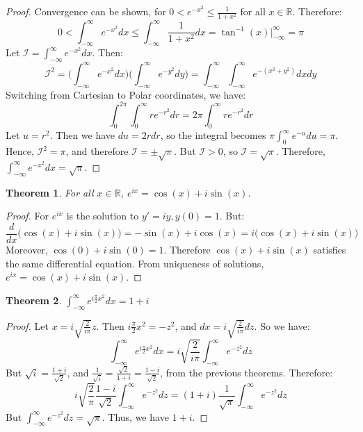 \documentclass[oneside]{book}
\theoremstyle{mystyle}
\newtheorem{theorem}{Theorem}[section]
\begin{document}
\begin{proof}
Convergence can be shown, for $0 < e^{-x^2} \leq \frac{1}{1+x^2}$ for all $x\in \mathbb{R}$. Therefore:
\begin{equation*}
0<\int_{-\infty}^{\infty} e^{-x^2}dx \leq \int_{-\infty}^{\infty} \frac{1}{1+x^2}dx = \tan^{-1}(x)\big|_{-\infty}^{\infty} = \pi
\end{equation*}
Let $\mathcal{I} = \int_{-\infty}^{\infty} e^{-x^2}dx$. Then:
\begin{equation*}
    \mathcal{I}^2 = \bigg(\int_{-\infty}^{\infty}e^{-x^2}dx\bigg)\bigg(\int_{-\infty}^{\infty}e^{-y^2}dy\bigg) = \int_{-\infty}^{\infty}\int_{-\infty}^{\infty}e^{-(x^2+y^2)}dxdy
\end{equation*}
Switching from Cartesian to Polar coordinates, we have:
\begin{equation*}
    \int_{0}^{2\pi}\int_{0}^{\infty} re^{-r^2}dr = 2\pi \int_{0}^{\infty}re^{-r^2}dr
\end{equation*}
Let $u = r^2$. Then we have $du = 2rdr$, so the integral becomes $\pi \int_{0}^{\infty} e^{-u}du = \pi$. Hence, $\mathcal{I}^2 = \pi$, and therefore $\mathcal{I} = \pm \sqrt{\pi}$. But $\mathcal{I} > 0$, so $\mathcal{I} = \sqrt{\pi}$. Therefore, $\int_{-\infty}^{\infty}e^{-x^2}dx = \sqrt{\pi}$. 
\end{proof}
\begin{theorem}
For all $x\in \mathbb{R}$, $e^{ix} = \cos(x)+i\sin(x)$.
\end{theorem}
\begin{proof}
For $e^{ix}$ is the solution to $y' = iy, y(0) = 1$. But:
\begin{equation*}
    \frac{d}{dx}\big(\cos(x)+i\sin(x)\big) = -\sin(x)+i\cos(x) = i\big(\cos(x)+i\sin(x)\big)
\end{equation*}
Moreover, $\cos(0)+i\sin(0) = 1$. Therefore $\cos(x)+i\sin(x)$ satisfies the same differential equation. From uniqueness of solutions, $e^{ix} = \cos(x)+i\sin(x)$.
\end{proof}
\begin{theorem}
$\int_{-\infty}^{\infty} e^{i\frac{\pi}{2}x^2}dx = 1+i$
\end{theorem}
\begin{proof}
Let $x = i\sqrt{\frac{2}{i\pi}}z$. Then $i\frac{\pi}{2}x^2 = -z^2$, and $dx = i\sqrt{\frac{2}{i\pi}}dz$. So we have:
\begin{equation*}
    \int_{-\infty}^{\infty}e^{i\frac{\pi}{2}x^2}dx = i\sqrt{\frac{2}{i\pi}}\int_{-\infty}^{\infty} e^{-z^2}dz    
\end{equation*}
But $\sqrt{i} = \frac{1+i}{\sqrt{2}}$, and $\frac{1}{\sqrt{i}} = \frac{\sqrt{2}}{1+i} = \frac{1-i}{\sqrt{2}}$, from the previous theorems. Therefore:
\begin{equation*}
    i\sqrt{\frac{2}{\pi}}\frac{1-i}{\sqrt{2}}\int_{-\infty}^{\infty}e^{-z^2}dz = (1+i)\frac{1}{\sqrt{\pi}}\int_{-\infty}^{\infty}e^{-z^2}dz
\end{equation*}
But $\int_{-\infty}^{\infty}e^{-z^2}dz = \sqrt{\pi}$. Thus, we have $1+i$.
\end{proof}
\end{document}

